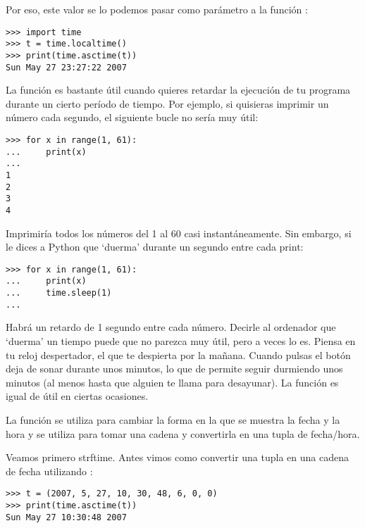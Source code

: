 \noindent
Por eso, este valor se lo podemos pasar como parámetro a la función :

\begin{listingignore}
\begin{verbatim}
>>> import time
>>> t = time.localtime()
>>> print(time.asctime(t))
Sun May 27 23:27:22 2007
\end{verbatim}
\end{listingignore}

\noindent
La función  es bastante útil cuando quieres retardar la ejecución de tu programa durante un cierto período de tiempo.   Por ejemplo, si quisieras imprimir un número cada segundo, el siguiente bucle no sería muy útil:

\begin{listing}
\begin{verbatim}
>>> for x in range(1, 61):
...     print(x)
...
1
2
3
4
\end{verbatim}
\end{listing}

Imprimiría todos los números del 1 al 60 casi instantáneamente.   Sin embargo, si le dices a Python que `duerma' durante un segundo entre cada print:

\begin{listing}
\begin{verbatim}
>>> for x in range(1, 61):
...     print(x)
...     time.sleep(1)
...
\end{verbatim}
\end{listing}

\noindent
Habrá un retardo de 1 segundo entre cada número.   Decirle al ordenador que `duerma' un tiempo puede que no parezca muy útil, pero a veces lo es.   Piensa en tu reloj despertador, el que te despierta por la mañana.   Cuando pulsas el botón deja de sonar durante unos minutos, lo que de permite seguir durmiendo unos minutos (al menos hasta que alguien te llama para desayunar).  La función  es igual de útil en ciertas ocasiones.

La función  se utiliza para cambiar la forma en la que se muestra la fecha y la hora y  se utiliza para tomar una cadena y convertirla en una tupla de fecha/hora.  

Veamos primero strftime.   Antes vimos como convertir una tupla en una cadena de fecha utilizando :

\begin{listing}
\begin{verbatim}
>>> t = (2007, 5, 27, 10, 30, 48, 6, 0, 0)
>>> print(time.asctime(t))
Sun May 27 10:30:48 2007
\end{verbatim}
\end{listing}

